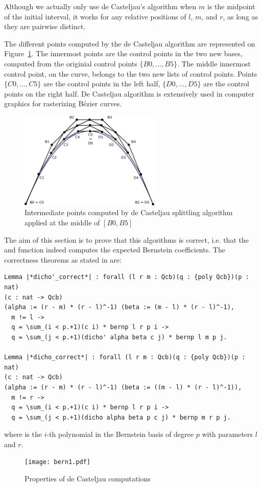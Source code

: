 \documentclass{mscs}
\begin{document}
Although we actually only use de Casteljau's algorithm when \(m\) is
the midpoint of the initial interval, it works for any relative
positions of \(l\), \(m\), and \(r\), as long as they are pairwise distinct.

The different points computed by the de Casteljau algorithm are
represented on Figure~\ref{dichobern}. The innermost points are the
control points in the two new bases, computed from the originial control
points $\{B0, \dots, B5\}$.
The middle innermost control point, on the curve, belongs to the two
new lists of control points. Points $\{C0, \dots, C5\}$ are the
control points in the left half, $\{D0, \dots, D5\}$ are the control
points on the right half.
De Casteljau algorithm is extensively used in computer  graphics for
rasterizing B{\'e}zier curves.

\begin{figure}[h]
\begin{center}
\includegraphics[width=0.6\textwidth]{dicho_bern.pdf}
\caption{\label{dichobern}Intermediate points computed by de Casteljau
splittling algorithm applied at the middle of $[B0, B5]$}
\end{center}
\end{figure}


The aim of this section is to prove that this algorithms is
correct, i.e. that the  and  function
indeed computes the expected Bernstein coefficients. The correctness
theorems as stated in \Coq{} are:
\begin{lstlisting}
Lemma |*dicho'_correct*| : forall (l r m : Qcb)(q : {poly Qcb})(p : nat)
(c : nat -> Qcb)
(alpha := (r - m) * (r - l)^-1) (beta := (m - l) * (r - l)^-1),
  m != l ->
  q = \sum_(i < p.+1)(c i) * bernp l r p i ->
  q = \sum_(j < p.+1)(dicho' alpha beta c j) * bernp l m p j.

Lemma |*dicho_correct*| : forall (l r m : Qcb)(q : {poly Qcb})(p : nat)
(c : nat -> Qcb)
(alpha := (r - m) * (r - l)^-1) (beta := ((m - l) * (r - l)^-1)),
  m != r ->
  q = \sum_(i < p.+1)(c i) * bernp l r p i ->
  q = \sum_(j < p.+1)(dicho alpha beta p c j) * bernp m r p j.
\end{lstlisting}
where  is the $i$-th polynomial in the Bernstein
basis of degree $p$ with parameters $l$ and $r$.
\begin{figure}[ht]
\begin{center}
\texttt{[image: bern1.pdf]}
\end{center}
\caption{\label{bern} Properties of de Casteljau computations}
\end{figure}
\end{document}
